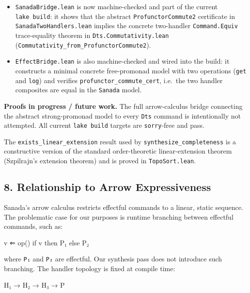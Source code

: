 \documentclass[
  11pt,
]{article}
\newenvironment{Shaded}{}{}
\newcommand{\NormalTok}[1]{#1}
\providecommand{\tightlist}{%
  \setlength{\itemsep}{0pt}\setlength{\parskip}{0pt}}
\begin{document}
\begin{itemize}
\tightlist
\item
  \texttt{SanadaBridge.lean} is now machine-checked and part of the
  current \texttt{lake\ build}: it shows that the abstract
  \texttt{ProfunctorCommute2} certificate in
  \texttt{SanadaTwoHandlers.lean} implies the concrete two-handler
  \texttt{Command.Equiv} trace-equality theorem in
  \texttt{Dts.Commutativity.lean}
  (\texttt{Commutativity\_from\_ProfunctorCommute2}).
\item
  \texttt{EffectBridge.lean} is also machine-checked and wired into the
  build: it constructs a minimal concrete free-promonad model with two
  operations (\texttt{get} and \texttt{log}) and verifies
  \texttt{profunctor\_commute\_cert}, i.e.~the two handler composites
  are equal in the \texttt{Sanada} model.
\end{itemize}

\textbf{Proofs in progress / future work.} The full arrow-calculus
bridge connecting the abstract strong-promonad model to every
\texttt{Dts} command is intentionally not attempted. All current
\texttt{lake\ build} targets are \texttt{sorry}-free and pass.

The \texttt{exists\_linear\_extension} result used by
\texttt{synthesize\_completeness} is a constructive version of the
standard order-theoretic linear-extension theorem (Szpilrajn's extension
theorem) and is proved in \texttt{TopoSort.lean}.

\subsection{8. Relationship to Arrow
Expressiveness}\label{relationship-to-arrow-expressiveness}

Sanada's arrow calculus restricts effectful commands to a linear, static
sequence. The problematic case for our purposes is runtime branching
between effectful commands, such as:

\begin{Shaded}
\begin{Highlighting}[]
\NormalTok{v ⇐ op()}
\NormalTok{if v then P₁ else P₂}
\end{Highlighting}
\end{Shaded}

where \texttt{P₁} and \texttt{P₂} are effectful. Our synthesis pass does
not introduce such branching. The handler topology is fixed at compile
time:

\begin{Shaded}
\begin{Highlighting}[]
\NormalTok{H₁ → H₂ → H₃ → P}
\end{Highlighting}
\end{Shaded}
\end{document}
